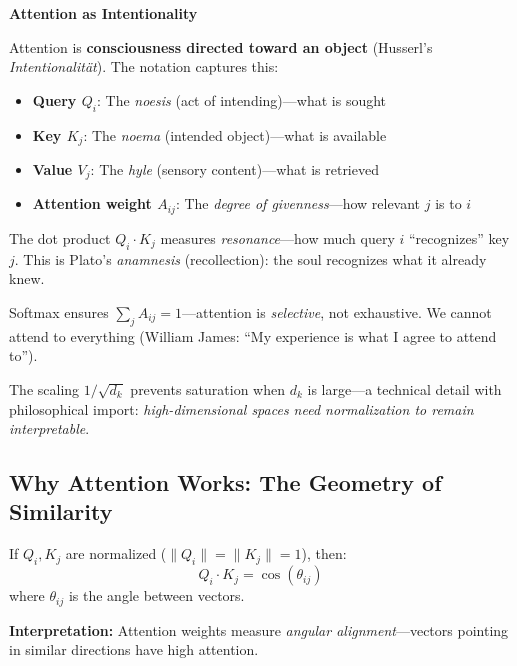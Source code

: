\begin{philobox}
	\textbf{Attention as Intentionality}
	
	Attention is \textbf{consciousness directed toward an object} (Husserl's \textit{Intentionalität}). The notation captures this:
	
	\begin{itemize}
		\item \textbf{Query $Q_i$}: The \textit{noesis} (act of intending)---what is sought
		\item \textbf{Key $K_j$}: The \textit{noema} (intended object)---what is available
		\item \textbf{Value $V_j$}: The \textit{hyle} (sensory content)---what is retrieved
		\item \textbf{Attention weight $A_{ij}$}: The \textit{degree of givenness}---how relevant $j$ is to $i$
	\end{itemize}
	
	The dot product $Q_i \cdot K_j$ measures \textit{resonance}---how much query $i$ ``recognizes'' key $j$. This is Plato's \textit{anamnesis} (recollection): the soul recognizes what it already knew.
	
	Softmax ensures $\sum_j A_{ij} = 1$---attention is \textit{selective}, not exhaustive. We cannot attend to everything (William James: ``My experience is what I agree to attend to'').
	
	The scaling $1/\sqrt{d_k}$ prevents saturation when $d_k$ is large---a technical detail with philosophical import: \textit{high-dimensional spaces need normalization to remain interpretable}.
\end{philobox}

\subsection{Why Attention Works: The Geometry of Similarity}

\begin{proposition}
	If $Q_i, K_j$ are normalized ($\|Q_i\| = \|K_j\| = 1$), then:
	\begin{equation}
		Q_i \cdot K_j = \cos(\theta_{ij})
	\end{equation}
	where $\theta_{ij}$ is the angle between vectors.
	
	\textbf{Interpretation:} Attention weights measure \textit{angular alignment}---vectors pointing in similar directions have high attention.
\end{proposition}

